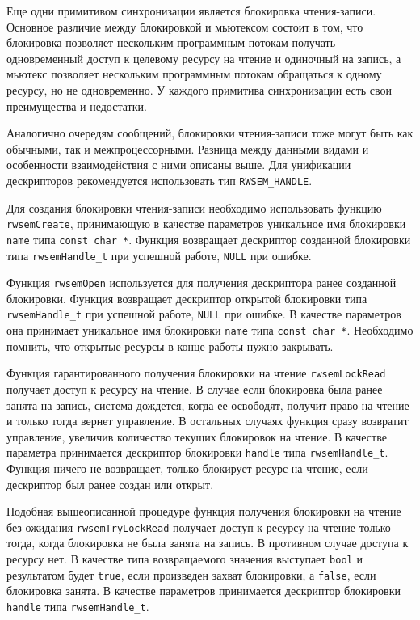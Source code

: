 Еще одни примитивом синхронизации является блокировка чтения-записи. Основное различие между блокировкой и мьютексом состоит в том, что блокировка позволяет нескольким программным потокам получать одновременный доступ
к целевому ресурсу на чтение и одиночный на запись, а мьютекс позволяет нескольким программным потокам обращаться к одному ресурсу, но не одновременно. У каждого примитива синхронизации есть свои преимущества и недостатки.

Аналогично очередям сообщений, блокировки чтения-записи тоже могут быть
как обычными, так и межпроцессорными. Разница между данными видами
и особенности взаимодействия с ними описаны выше. Для унификации
дескрипторов рекомендуется использовать тип \lstinline{RWSEM_HANDLE}.

Для создания блокировки чтения-записи необходимо использовать функцию \lstinline{rwsemCreate}, принимающую в качестве параметров уникальное имя блокировки \lstinline{name} типа
\lstinline{const char *}. Функция возвращает дескриптор созданной блокировки типа \lstinline{rwsemHandle_t} при успешной работе, \lstinline{NULL} при ошибке.

Функция \lstinline{rwsemOpen} используется для получения дескриптора ранее созданной блокировки. Функция возвращает дескриптор открытой блокировки типа \lstinline{rwsemHandle_t} при успешной работе, \lstinline{NULL} при ошибке. В качестве параметров она принимает уникальное имя блокировки \lstinline{name} типа \lstinline{const char *}. Необходимо помнить, что открытые
ресурсы в конце работы нужно закрывать.

Функция гарантированного получения блокировки на чтение \lstinline{rwsemLockRead} получает доступ к ресурсу на чтение. В случае если блокировка была ранее занята на запись, система дождется, когда ее освободят, получит право на чтение и только тогда вернет управление. В остальных случаях функция сразу возвратит управление,
увеличив количество текущих блокировок на чтение.
В качестве параметра принимается дескриптор блокировки \lstinline{handle} типа \lstinline{rwsemHandle_t}. Функция ничего не
возвращает, только блокирует ресурс на чтение, если дескриптор был ранее создан или открыт.

Подобная вышеописанной процедуре функция получения блокировки на чтение без ожидания \lstinline{rwsemTryLockRead} получает доступ к ресурсу на чтение только тогда, когда блокировка не была занята на запись. В противном случае доступа к ресурсу нет. В качестве типа возвращаемого значения выступает \lstinline{bool} и результатом будет \lstinline{true}, если произведен захват блокировки, а \lstinline{false}, если блокировка занята. В качестве параметров принимается дескриптор блокировки \lstinline{handle} типа \lstinline{rwsemHandle_t}.

